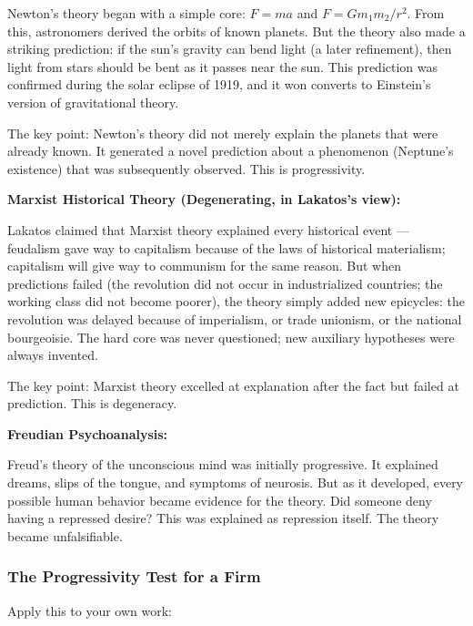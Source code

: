 \documentclass[11pt,letterpaper]{article}
\begin{document}
Newton's theory began with a simple core: $F = ma$ and $F = Gm_1m_2/r^2$. From this, astronomers derived the orbits of known planets. But the theory also made a striking prediction: if the sun's gravity can bend light (a later refinement), then light from stars should be bent as it passes near the sun. This prediction was confirmed during the solar eclipse of 1919, and it won converts to Einstein's version of gravitational theory.

The key point: Newton's theory did not merely explain the planets that were already known. It generated a novel prediction about a phenomenon (Neptune's existence) that was subsequently observed. This is progressivity.

\textbf{Marxist Historical Theory (Degenerating, in Lakatos's view):}

Lakatos claimed that Marxist theory explained every historical event — feudalism gave way to capitalism because of the laws of historical materialism; capitalism will give way to communism for the same reason. But when predictions failed (the revolution did not occur in industrialized countries; the working class did not become poorer), the theory simply added new epicycles: the revolution was delayed because of imperialism, or trade unionism, or the national bourgeoisie. The hard core was never questioned; new auxiliary hypotheses were always invented.

The key point: Marxist theory excelled at explanation after the fact but failed at prediction. This is degeneracy.

\textbf{Freudian Psychoanalysis:}

Freud's theory of the unconscious mind was initially progressive. It explained dreams, slips of the tongue, and symptoms of neurosis. But as it developed, every possible human behavior became evidence for the theory. Did someone deny having a repressed desire? This was explained as repression itself. The theory became unfalsifiable.

\subsubsection*{The Progressivity Test for a Firm}

Apply this to your own work:
\end{document}

